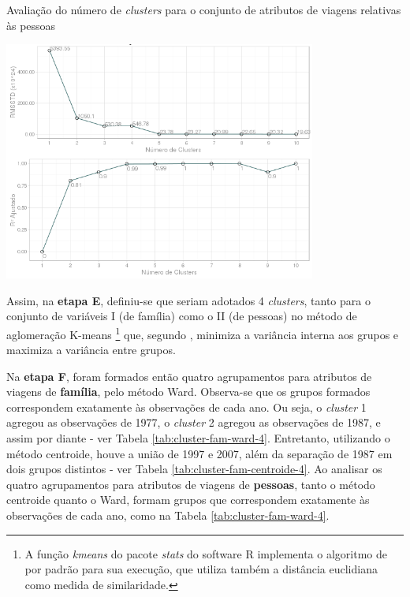 \begin{grafico}[htb]%
    \caption{\label{graf:rmsstd-r2-cluster-pess-total}Avaliação do número de \textit{clusters} para o conjunto de atributos de viagens relativas às pessoas}%
    \begin{center}%
        \includegraphics[width=0.77\textwidth]{./imagens/No-clusters-R2-RMSSTD-pessoas.png}%
    \end{center}%
\end{grafico}%

\clearpage
Assim, na \textbf{etapa E}, definiu-se que seriam adotados 4 \textit{clusters}, tanto para o conjunto de variáveis I (de família) como o II (de pessoas) no método de aglomeração K-means%
\footnote{ A função \textit{kmeans} do pacote \textit{stats} do software R implementa o algoritmo de  por padrão para sua execução, que utiliza também a distância euclidiana como medida de similaridade.} 
que, segundo , minimiza a variância interna aos grupos e maximiza a variância entre grupos.

Na \textbf{etapa F}, foram formados então quatro agrupamentos para atributos de viagens de \textbf{família}, pelo método Ward. Observa-se que os grupos formados correspondem exatamente às observações de cada ano. 
Ou seja, o \textit{cluster} 1 agregou as observações de 1977, o \textit{cluster} 2 agregou as observações de 1987, e assim por diante - ver Tabela \ref{tab:cluster-fam-ward-4}. Entretanto, utilizando o método centroide, houve a união de 1997 e 2007, além da separação de 1987 em dois grupos distintos - ver Tabela \ref{tab:cluster-fam-centroide-4}.
Ao analisar os quatro agrupamentos para atributos de viagens de \textbf{pessoas}, tanto o método centroide quanto o Ward, formam grupos que correspondem exatamente às observações de cada ano, como na Tabela \ref{tab:cluster-fam-ward-4}.

